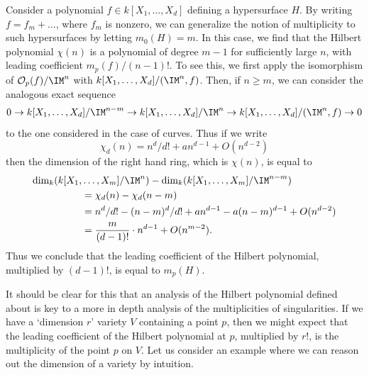 \begin{example}
    Consider a polynomial $f \in k[X_1, \dots, X_d]$ defining a hypersurface $H$. By writing $f = f_m + \dots$, where $f_m$ is nonzero, we can generalize the notion of multiplicity to such hypersurfaces by letting $m_0(H) = m$. In this case, we find that the Hilbert polynomial $\chi(n)$ is a polynomial of degree $m-1$ for sufficiently large $n$, with leading coefficient $m_p(f)/(n-1)!$. To see this, we first apply the isomorphism of $\mathcal{O}_p(f)/\IM^n$ with $k[X_1, \dots, X_d]/(\IM^n,f)$. Then, if $n \geq m$, we can consider the analogous exact sequence
    \[ 0 \to k[X_1, \dots, X_d]/\IM^{n-m} \to k[X_1, \dots, X_d]/\IM^n \to k[X_1, \dots, X_d]/(\IM^n, f) \to 0 \]
    to the one considered in the case of curves. Thus if we write
    \[ \chi_d(n) = n^d/d! + an^{d-1} + O(n^{d-2}) \]
    then the dimension of the right hand ring, which is $\chi(n)$, is equal to
    \begin{align*}
        \dim_k(k[X_1,& \dots, X_m]/\IM^n) - \dim_k(k[X_1, \dots, X_m]/\IM^{n-m})\\
        &= \chi_d(n) - \chi_d(n-m)\\
        &= n^d/d! - (n-m)^d/d! + an^{d-1} - a(n-m)^{d-1} + O(n^{d-2})\\
        &= \frac{m}{(d-1)!} \cdot n^{d-1} + O(n^{m-2}).
    \end{align*}
    Thus we conclude that the leading coefficient of the Hilbert polynomial, multiplied by $(d-1)!$, is equal to $m_p(H)$.
\end{example}

It should be clear for this that an analysis of the Hilbert polynomial defined about is key to a more in depth analysis of the multiplicities of singularities. If we have a `dimension $r$' variety $V$ containing a point $p$, then we might expect that the leading coefficient of the Hilbert polynomial at $p$, multiplied by $r!$, is the multiplicity of the point $p$ on $V$. Let us consider an example where we can reason out the dimension of a variety by intuition.

